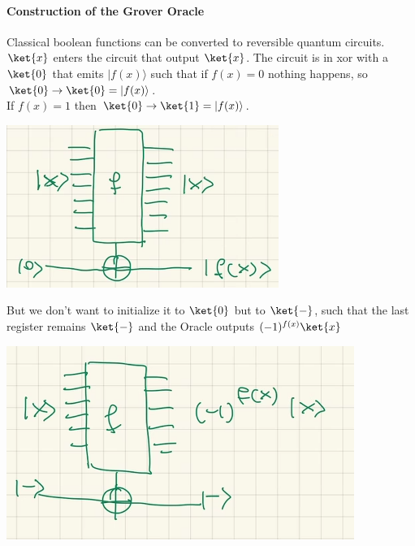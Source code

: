 \documentclass[10pt]{report}
\begin{document}
\paragraph{Construction of the Grover Oracle} Classical boolean functions can be converted to reversible quantum circuits.
$\ket{x}$ enters the circuit that output $\ket{x}$. The circuit is in xor with a $\ket{0}$ that emits $|f(x)\rangle$ such that if $f(x)=0$ nothing happens, so $\ket{0}\rightarrow\ket{0} = |f(x)\rangle$.\\
If $f(x) = 1$ then $\ket{0}\rightarrow\ket{1}=|f(x)\rangle$.
\begin{center}
	\includegraphics[scale=0.5]{30.png}
\end{center}
But we don't want to initialize it to $\ket{0}$ but to $\ket{-}$, such that the last register remains $\ket{-}$ and the Oracle outputs $(-1)^{f(x)}\ket{x}$
\begin{center}
	\includegraphics[scale=0.5]{31.png}
\end{center}
\end{document}
